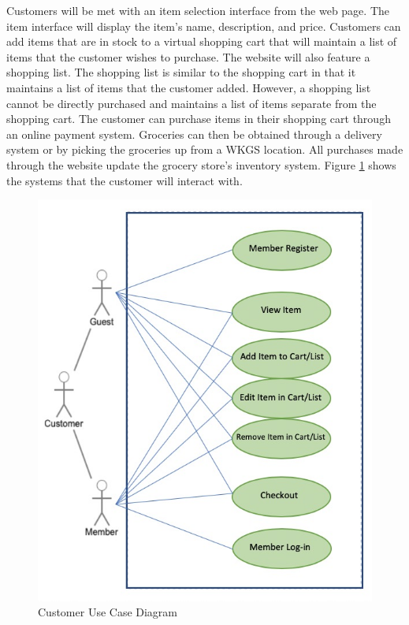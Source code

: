 \documentclass{scrreprt}
\theoremstyle{funreq}
\begin{document}
Customers will be met with an item selection interface from the web page.  The item interface will display the item's name, description, and price.  Customers can add items that are in stock to a virtual shopping cart that will maintain a list of items that the customer wishes to purchase.  The website will also feature a shopping list.  The shopping list is similar to the shopping cart in that it maintains a list of items that the customer added.  However, a shopping list cannot be directly purchased and maintains a list of items separate from the shopping cart.  The customer can purchase items in their shopping cart through an online payment system.  Groceries can then be obtained through a delivery system or by picking the groceries up from a WKGS location.  All purchases made through the website update the grocery store's inventory system.  Figure \ref{customer_diag} shows the systems that the customer will interact with.

\begin{figure}[H]
	\begin{center}
		\includegraphics[width=3 in]{Customerusecase.jpeg}
		\caption{Customer Use Case Diagram}
		\label{customer_diag}
	\end{center}
\end{figure}
\end{document}
